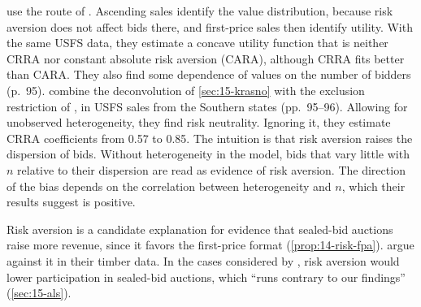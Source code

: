 \citet{LuPerrigne2008} use the route of \citet[footnote 74]{AtheyHaile2007}. Ascending sales identify the
value distribution, because risk aversion does not affect bids there, and first-price sales then
identify utility. With the same USFS data, they estimate a concave utility function that is neither
CRRA nor constant absolute risk aversion (CARA), although CRRA fits better than CARA. They also find some dependence of values on the
number of bidders (p.~95). \citet{GrundlZhu2019} combine the deconvolution of \cref{sec:15-krasno} with
the exclusion restriction of \citet{GuerrePerrigneVuong2009}, in USFS sales from the Southern states
(pp.~95--96). Allowing for unobserved heterogeneity, they find risk neutrality. Ignoring it, they
estimate CRRA coefficients from 0.57 to 0.85. The intuition is that risk aversion raises the
dispersion of bids. Without heterogeneity in the model, bids that vary little with $n$ relative to
their dispersion are read as evidence of risk aversion. The direction of the bias depends on the
correlation between heterogeneity and $n$, which their results suggest is positive.

Risk aversion is a candidate explanation for evidence that sealed-bid auctions raise more revenue,
since it favors the first-price format (\cref{prop:14-risk-fpa}). \citet[pp.~234--235]{AtheyLevinSeira2011}
argue against it in their timber data. In the cases considered by \citet{Matthews1987}, risk aversion
would lower participation in sealed-bid auctions, which ``runs contrary to our findings''
(\cref{sec:15-als}).
